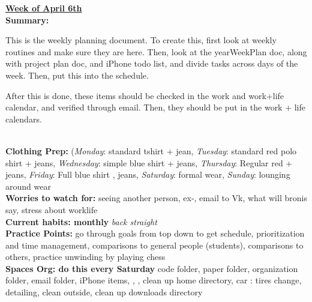 

{\huge{\underline{\textbf{Week of April 6th}}}} \\
\textbf{Summary:} {\small This is the weekly planning document. To create
this, first look at weekly routines and make sure they are here. Then,
look at the yearWeekPlan doc, along with project plan doc, and iPhone
todo list, and divide tasks across days of the week. Then, put this
into the schedule.

After this is done, these items should be checked in the work and
work+life calendar, and verified through email.
Then, they should be put in the work + life
calendars.}\\

\textbf{Clothing Prep: }{\small (\textit{Monday}: standard tshirt + jean, \textit{Tuesday}: standard red polo shirt + jeans, \textit{Wednesday}: simple  blue shirt + jeans,
 \textit{Thursday}: Regular red + jeans, \textit{Friday}: Full blue shirt , jeans, \textit{Saturday}: formal wear,  \textit{Sunday}: lounging around wear }\\

\textbf{Worries to watch for: }
{\small seeing another person,
ex-,
email to Vk,
what will bronis say,
stress about worklife}
\\

\textbf{Current habits: monthly}
{\small \textit{back straight}}
\\
\textbf{Practice Points:} {\small go through goals from top down to get schedule, prioritization and time management,
comparisons to general people (students),  comparisons to others, practice unwinding by playing chess }\\

\textbf{Spaces Org: do this every Saturday } {\small code folder, paper folder, organization folder,  email folder, iPhone items,
, , clean up home directory, car : tires change, detailing, clean outside, clean up downloads directory}\\

